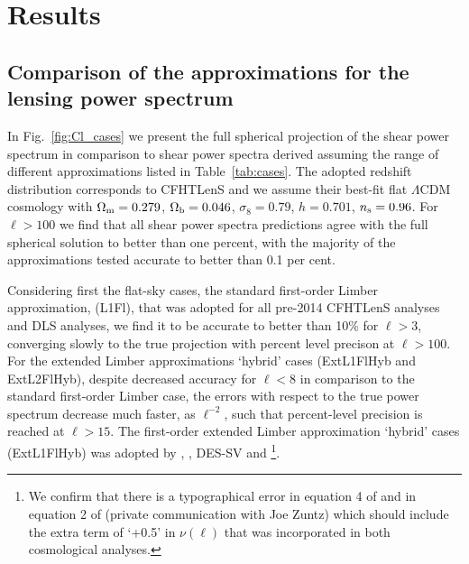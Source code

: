 \documentclass[fleqn,usenatbib]{mnras} %
\begin{document}
\section{Results}
\label{sec:results}

\subsection{Comparison of the approximations for the lensing power spectrum}
\label{sec:comp}


In Fig.~\ref{fig:Cl_cases} we present the full spherical projection of the
shear power spectrum in comparison to shear power spectra derived assuming the
range of different approximations listed in Table~\ref{tab:cases}.  The adopted
redshift distribution corresponds to CFHTLenS \citep{CFHTLenS-2pt-notomo} and
we assume their best-fit flat $\Lambda$CDM cosmology with $\Omega_{\rm
m}=0.279$, $\Omega_{\rm b}=0.046$, $\sigma_8=0.79$, $h=0.701$, $n_{\rm
s}=0.96$. For $\ell > 100$ we find that all shear power spectra predictions
agree with the full spherical solution to better than one percent, with the
majority of the approximations tested accurate to better than 0.1 per cent.   

Considering first the flat-sky cases, the standard first-order Limber
approximation, (L1Fl), that was adopted for all pre-2014 CFHTLenS analyses and DLS analyses, we
find it to be accurate to better than 10\% for $\ell>3$, converging slowly to the
true projection with percent level precison at $\ell>100$. For the extended
Limber approximations `hybrid' cases (ExtL1FlHyb and ExtL2FlHyb), despite
decreased accuracy for $\ell < 8$ in comparison to the standard first-order
Limber case, the errors with respect to the true power spectrum decrease much
faster, as $\ell^{-2}$, such that percent-level precision is reached at
$\ell>15$.  The first-order extended Limber approximation `hybrid' cases
(ExtL1FlHyb) was adopted by \citet{joudaki/etal:2016}, \citet{joudaki/etal:2017}, DES-SV \citep{abbott/etal:2016} and
\cite{KiDS-450}\footnote{We confirm that there is a typographical error in
equation 4 of \cite{KiDS-450} and in equation 2 of \citet{abbott/etal:2016} (private communication with Joe Zuntz) 
which should include the extra term of `+0.5' in
$\nu(\ell)$ that was incorporated in both cosmological analyses.}. 
\end{document}
